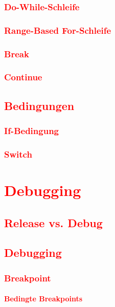 \subsection{\textcolor{red}{Do-While-Schleife}}\label{sec:do-while-loop}
\subsection{\textcolor{red}{Range-Based For-Schleife}}\label{sec:range-based-for-loop}
\subsection{\textcolor{red}{Break}}\label{sec:break}
\subsection{\textcolor{red}{Continue}}\label{sec:continue}
\section{\textcolor{red}{Bedingungen}}\label{sec:conditions}
\subsection{\textcolor{red}{If-Bedingung}}\label{sec:if-condition}
\subsection{\textcolor{red}{Switch}}\label{sec:switch}

\cleardoublepage\chapter{\textcolor{red}{Debugging}}\label{chap:debugging}
\section{\textcolor{red}{Release vs. Debug}}\label{sec:release-vs-debug}
\section{\textcolor{red}{Debugging}}\label{sec:debugging}
\subsection{\textcolor{red}{Breakpoint}}\label{sec:breakpoint}
\subsubsection{\textcolor{red}{Bedingte Breakpoints}}\label{sec:conditional-breakpoint}
